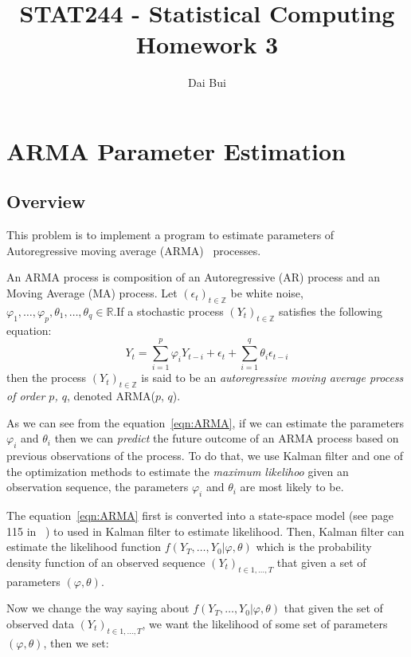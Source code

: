 \documentclass{article}
\title{STAT244 - Statistical Computing\\Homework 3}
\author{Dai Bui}
\begin{document}
\date{}
\maketitle

 \section{ARMA Parameter Estimation}
 \subsection{Overview}
 This problem is to implement a program to estimate parameters of 
 Autoregressive moving average (ARMA)~\cite{BoxTimeSeries, FalkStatSAS}
 processes.
 
 An ARMA process is composition of an Autoregressive (AR) process and an Moving
 Average (MA) process. Let $(\epsilon_t)_{t\in \mathbb{Z}}$ be white noise,
 $\varphi_1, \ldots, \varphi_p, \theta_1, \ldots, \theta_q\in\mathbb{R}$.If a
stochastic process $(Y_t)_{t\in \mathbb{Z}}$ satisfies the following
 equation:
 \begin{equation}\label{eqn:ARMA}
 Y_t=\sum_{i=1}^{p}\varphi_iY_{t-i}+
 \epsilon_t +\sum_{i=1}^{q}\theta_i\epsilon_{t-i}
 \end{equation}
then the process $(Y_t)_{t\in \mathbb{Z}}$ is said to be
an \textit{autoregressive moving average process of order $p$, $q$}, denoted
ARMA($p$, $q$).

As we can see from the equation~\ref{eqn:ARMA}, if we can estimate the
parameters $\varphi_i$ and $\theta_i$ then we can \textit{predict} the future
outcome of an ARMA process based on previous observations of the process. To do
that, we use Kalman filter and one of the optimization methods to estimate the
\textit{maximum likelihoo} given an observation sequence, the parameters
$\varphi_i$ and $\theta_i$ are most likely to be.

The equation~\ref{eqn:ARMA} first is converted into a state-space model (see
page 115 in~\cite{FalkStatSAS} ) to used in Kalman filter to estimate
likelihood. Then, Kalman filter can estimate the likelihood function
$f(Y_T,\ldots, Y_0|\varphi, \theta)$ which is the probability density
function of an observed sequence $(Y_t)_{t\in 1, \ldots, T}$ that given a set of
parameters $(\varphi, \theta)$.

Now we change the way saying about $f(Y_T,\ldots,Y_0|\varphi, \theta)$ that
given the set of observed data $(Y_t)_{t\in 1, \ldots, T}$, we want the likelihood of
some set of parameters $(\varphi, \theta)$, then we set:
\end{document}
